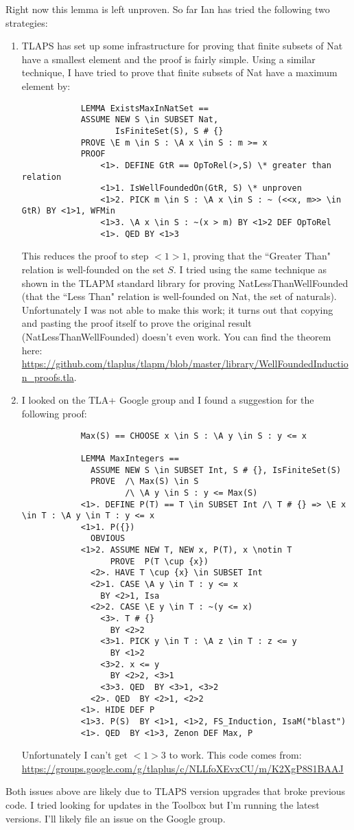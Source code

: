 \documentclass[12pt]{article}
\begin{document}
Right now this lemma is left unproven.  So far Ian has tried the following two strategies:
\begin{enumerate}
	\item TLAPS has set up some infrastructure for proving that finite subsets of Nat have a smallest element and the proof is fairly simple.  Using a similar technique, I have tried to prove that finite subsets of Nat have a maximum element by:
		\begin{verbatim}
			LEMMA ExistsMaxInNatSet ==
			ASSUME NEW S \in SUBSET Nat,
			       IsFiniteSet(S), S # {}
			PROVE \E m \in S : \A x \in S : m >= x
			PROOF
			    <1>. DEFINE GtR == OpToRel(>,S) \* greater than relation
			    <1>1. IsWellFoundedOn(GtR, S) \* unproven
			    <1>2. PICK m \in S : \A x \in S : ~ (<<x, m>> \in GtR) BY <1>1, WFMin
			    <1>3. \A x \in S : ~(x > m) BY <1>2 DEF OpToRel
			    <1>. QED BY <1>3
		\end{verbatim}
		
		This reduces the proof to step $<1>1$, proving that the ``Greater Than" relation is well-founded on the set $S$.  I tried using the same technique as shown in the TLAPM standard library for proving NatLessThanWellFounded (that the ``Less Than" relation is well-founded on Nat, the set of naturals).  Unfortunately I was not able to make this work; it turns out that copying and pasting the proof itself to prove the original result (NatLessThanWellFounded) doesn't even work.  You can find the theorem here: \url{https://github.com/tlaplus/tlapm/blob/master/library/WellFoundedInduction_proofs.tla}.  

	\item I looked on the TLA+ Google group and I found a suggestion for the following proof:
		\begin{verbatim}
			Max(S) == CHOOSE x \in S : \A y \in S : y <= x
			
			LEMMA MaxIntegers ==
			  ASSUME NEW S \in SUBSET Int, S # {}, IsFiniteSet(S)
			  PROVE  /\ Max(S) \in S
			         /\ \A y \in S : y <= Max(S)
			<1>. DEFINE P(T) == T \in SUBSET Int /\ T # {} => \E x \in T : \A y \in T : y <= x
			<1>1. P({})
			  OBVIOUS
			<1>2. ASSUME NEW T, NEW x, P(T), x \notin T
			      PROVE  P(T \cup {x})
			  <2>. HAVE T \cup {x} \in SUBSET Int
			  <2>1. CASE \A y \in T : y <= x
			    BY <2>1, Isa
			  <2>2. CASE \E y \in T : ~(y <= x)
			    <3>. T # {}
			      BY <2>2
			    <3>1. PICK y \in T : \A z \in T : z <= y
			      BY <1>2
			    <3>2. x <= y
			      BY <2>2, <3>1
			    <3>3. QED  BY <3>1, <3>2
			  <2>. QED  BY <2>1, <2>2
			<1>. HIDE DEF P
			<1>3. P(S)  BY <1>1, <1>2, FS_Induction, IsaM("blast")
			<1>. QED  BY <1>3, Zenon DEF Max, P
		\end{verbatim}

		Unfortunately I can't get $<1>3$ to work.  This code comes from: \url{https://groups.google.com/g/tlaplus/c/NLLfoXEvxCU/m/K2XgP8S1BAAJ}
\end{enumerate}

Both issues above are likely due to TLAPS version upgrades that broke previous code.  I tried looking for updates in the Toolbox but I'm running the latest versions.  I'll likely file an issue on the Google group.  
\end{document}
